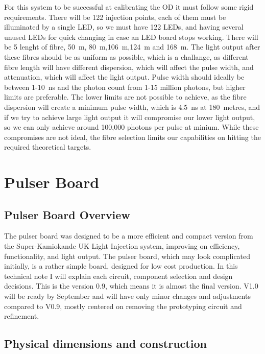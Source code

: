 \documentclass[a4paper,11pt]{article}
\begin{document}
For this system to be successful at calibrating the OD it must follow some rigid requirements. There will be 122 injection points, each of them must be illuminated by a single LED, so we must have 122 LEDs, and having several unused LEDs for quick changing in case an LED board stops working. There will be 5 lenght of fibre, 50~m, 80~m,106~m,124~m and 168~m. The light output after these fibres should be as uniform as possible, which is a challange, as different fibre length will have different dispersion, which will affect the pulse width, and attenuation, which will affect the light output. Pulse width should ideally be between 1-10~ns and the photon count from 1-15 million photons, but higher limits are preferable. The lower limits are not possible to achieve, as the fibre dispersion will create a minimum pulse width, which is 4.5~ns at 180~metres, and if we try to achieve large light output it will compromise our lower light output, so we can only achieve around 100,000 photons per pulse at minium. While these compromises are not ideal, the fibre selection limits our capabilities on hitting the required theoretical targets.
\section{Pulser Board}

\subsection{Pulser Board Overview}

The pulser board was designed to be a more efficient and compact version from the Super-Kamiokande UK Light Injection system, improving on efficiency, functionality, and light output. The pulser board, which may look complicated initially, is a rather simple board, designed for low cost production. In this technical note I will explain each circuit, component selection and design decisions. This is the version 0.9, which means it is almost the final version. V1.0 will be ready by September and will have only minor changes and adjustments compared to V0.9, mostly centered on removing the prototyping circuit and refinement. 


\subsection{Physical dimensions and construction}
\end{document}
